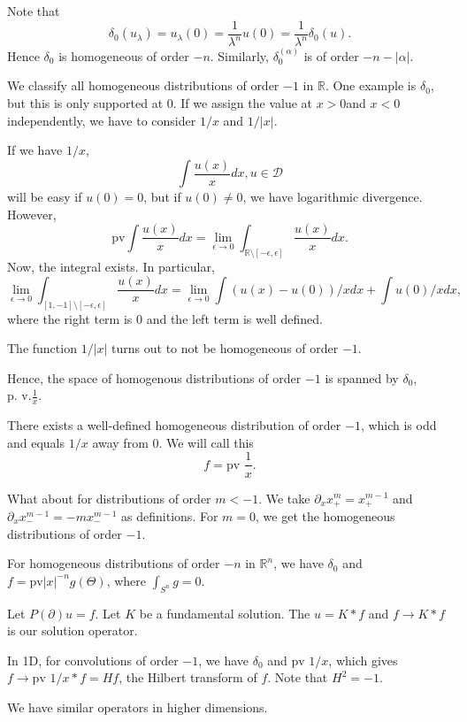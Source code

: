 \documentclass[12pt]{scrartcl}
\newcommand{\R}{\mathbb{R}}
\begin{document}
\begin{example} Note that $$\delta_0(u_\lambda) = u_\lambda(0) = \frac{1}{\lambda^n} u(0) = \frac{1}{\lambda^n} \delta_0(u).$$
Hence $\delta_0$ is homogeneous of order $-n$. Similarly, $\delta_0^(\alpha)$ is of order $-n-|\alpha|$.
\end{example}
\begin{example}
We classify all homogeneous distributions of order $-1$ in $\R$.  One example is $\delta_0$, but this is only supported at $0$.   If we assign the value at $x>0 $and $x < 0$ independently, we have to consider $1/x$ and $1/|x|$.  

If we have $1/x$,
$$\int \frac{u(x)}{x}dx, u \in \mathcal D$$
will be easy if $u(0) = 0$, but if $u(0) \ne 0$, we have logarithmic divergence.  However, 
$$\text{pv}\int \frac{u(x)}{x}dx = \lim_{\epsilon \rightarrow 0} \int_{\R\setminus [-\epsilon, \epsilon]}\frac{u(x)}{x}dx.$$
Now, the integral exists.  In particular,
$$\lim_{\epsilon \rightarrow 0} \int_{[1, -1] \setminus [-\epsilon, \epsilon]} \frac{u(x)}{x}dx = \lim_{\epsilon \rightarrow 0} \int (u(x)-u(0))/xdx + \int u(0)/xdx,$$
where the right term is 0 and the left term is well defined.

The function $1/|x|$ turns out to not be homogeneous of order $-1$.

Hence, the space of homogenous distributions of order $-1$ is spanned by $\delta_0$, $\text{p. v.} \frac{1}{x}.$
\end{example}
\begin{proposition} There exists a well-defined homogeneous distribution of order $-1$, which is odd and equals $1/x$ away from 0.  We will call this 
$$f = \text{pv } \frac{1}{x}.$$
\end{proposition}

What about for distributions of order $m < -1$.  We take $\partial_x x_+^m = x_+^{m-1}$ and $\partial_x x_-^{m-1} = -m x_-^{m-1}$ as definitions.  For $m=0$, we get the homogeneous distributions of order $-1$.  

For homogeneous distributions of order $-n$ in $\R^n$, we have $\delta_0$
 and $f = \text{pv} |x|^{-n}g(\Theta)$, where $\int_{S^n}g = 0$.  
 
\begin{example}
Let $P(\partial) u = f$.  Let $K$ be a fundamental solution.  The $u = K*f$ and $f \to K*f$ is our solution operator.  

In 1D, for convolutions of order $-1$, we have $\delta_0$ and $\text{pv }1/x$, which gives $f \to \text{pv }1/x * f = Hf$, the Hilbert transform of $f$.  Note that $H^2 = -1$.

We have similar operators in higher dimensions. 
\end{example}
\pagebreak
\end{document}
